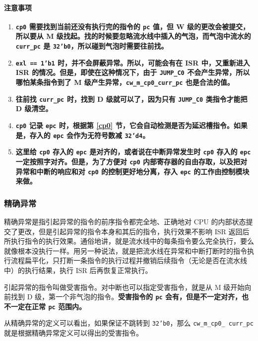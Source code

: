 \documentclass[12pt,AutoFakeBold,AutoFakeSlant]{article}
\providecommand{\tightlist}{%
  \setlength{\itemsep}{0pt}\setlength{\parskip}{0pt}}
\newcommand{\ms}[1]{\texttt{#1}}
\begin{document}
\paragraph{注意事项}

\begin{enumerate}
\tightlist
\item
\textbf{\ms{cp0} 需要找到当前还没有执行完的指令的 \ms{pc} 值，但 W 级的更改会被提交，所以要从 M 级找起。找的时候要忽略流水线中插入的气泡，而气泡中流水的 \ms{curr\_pc} 是 \ms{32'b0}，所以碰到气泡时需要往前找。}
\item
\textbf{\ms{exl == 1'b1} 时，并不会屏蔽异常。所以，可能会有在 ISR 中，又重新进入 ISR 的情况。但是，即使在这种情况下，由于 \ms{JUMP\_C0} 不会产生异常，所以哪怕某条指令到了 M 级产生异常，\ms{cw\_m\_cp0\_curr\_pc} 也是合法的值。}
\item
\textbf{往前找 \ms{curr\_pc} 时，找到 D 级就可以了，因为只有 \ms{JUMP\_C0} 类指令才能把 D 级清空。}
\item
\textbf{\ms{cp0} 记录 \ms{epc} 时，根据第 \ref{cp0} 节，它会自动检测是否为延迟槽指令。如果是，存入的 \ms{epc} 会作为无符号数减 \ms{32'd4}。}
\item
\textbf{这里给 \ms{cp0} 存入的 \ms{epc} 是对齐的，或者说在中断异常发生时 \ms{cp0} 存入的 \ms{epc} 一定按照字对齐。但是，为了方便对 \ms{cp0} 内部寄存器的自由存取，以及把对异常和中断的响应和对 \ms{cp0} 的控制更好地分离，存入 \ms{epc} 的工作由控制模块来做。}
\end{enumerate}

\subsubsection{精确异常}

精确异常是指引起异常的指令的前序指令都完全地、正确地对 CPU 的内部状态提交了更改，但是引起异常的指令本身和其后的指令，执行效果不影响 ISR 返回后所执行指令的执行效果。通俗地讲，就是流水线中的每条指令要么完全执行，要么就像根本没执行一样。用另一种说法，就是把流水线在异常和中断打断时的指令执行流程扁平化，只打断一条指令的执行过程并撤销后续指令（无论是否在流水线中）的执行结果，执行 ISR 后再恢复正常执行。

引起异常的指令叫做受害指令。对中断也可以指定受害指令，就是从 M 级开始向前找到 D 级，第一个非气泡的指令。\textbf{受害指令的 \ms{pc} 会有，但是不一定对齐，也不一定在正常 \ms{pc} 范围内。}

从精确异常的定义可以看出，如果保证不跳转到 \ms{32'b0}，那么 \ms{cw\_m\_cp0\_\ curr\_pc} 就是根据精确异常定义可以得出的受害指令。
\end{document}
